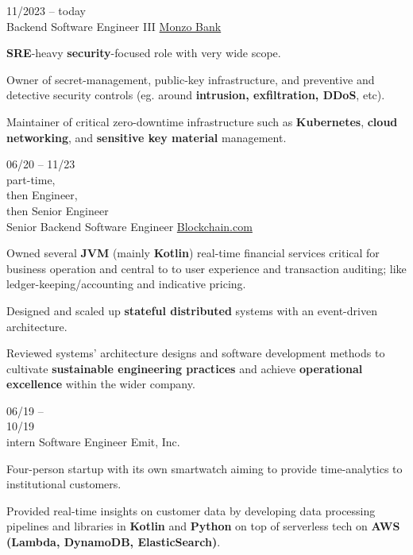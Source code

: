 \begin{entrylist}


    \entry
    {
        11/2023 -- today \\
    }
    {Backend Software Engineer III}
    {\href{https://monzo.com}{Monzo Bank}}
    {
        \textbf{SRE}-heavy \textbf{security}-focused role with very wide scope.

        \para

        Owner of secret-management, public-key infrastructure, and preventive and detective security controls (eg. around \textbf{intrusion, exfiltration, DDoS}, etc).

        \para

        Maintainer of critical zero-downtime infrastructure such as \textbf{Kubernetes}, \textbf{cloud networking}, and \textbf{sensitive key material} management.
    }
    \entry
    {
        06/20 -- 11/23   \\\footnotesize{part-time,\\ then Engineer,\\ then Senior Engineer}        \\
    }
    {Senior Backend Software Engineer}
    {\href{https://blockchain.com/about}{Blockchain.com}}
    {
        Owned several \textbf{JVM} (mainly \textbf{Kotlin}) real-time financial services critical for business operation and central to
        to user experience and transaction auditing; like ledger-keeping/accounting and indicative pricing.

        \para
        Designed and scaled up \textbf{stateful distributed} systems with an event-driven architecture.

        \para
        Reviewed systems' architecture designs and software development methods to cultivate \textbf{sustainable engineering practices}
        and achieve \textbf{operational excellence} within the wider company.



    }
    \entry
    {06/19 --        \\ 10/19        \\\footnotesize{intern}}
    {Software Engineer}
    {Emit, Inc.}
    {
        Four-person startup with its own smartwatch aiming to provide time-analytics to
        institutional customers.

        \para
        Provided real-time insights on customer data by developing data processing pipelines and libraries in
        \textbf{Kotlin} and \textbf{Python} on top of serverless tech on \textbf{AWS (Lambda,
            DynamoDB, ElasticSearch)}.
    }
\end{entrylist}
